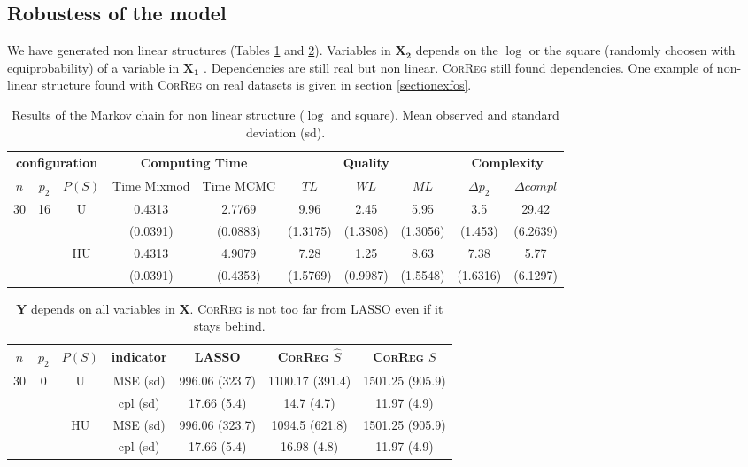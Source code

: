 \documentclass[11pt,a4paper]{article}
\begin{document}
\subsection{Robustess of the model}
 We have generated non linear structures (Tables \ref{compZnonlin} and \ref{resYnonlin}). Variables in $\boldsymbol{X_2}$ depends on the $\log$ or the square (randomly choosen with equiprobability) of a variable in $\boldsymbol{X_1}$ . Dependencies are still real but non linear. \textsc{CorReg} still found dependencies. One example of non-linear structure found with \textsc{CorReg} on real datasets is given in section \ref{sectionexfos}.
\begin{table}[h!]
\centering
\begin{tabular}{|c|c|c|c|c|c|c|c|c|c|}
\hline
\multicolumn{3}{|c}{configuration}  &  \multicolumn{2}{|c}{Computing Time}  & \multicolumn{3}{|c}{Quality} & \multicolumn{2}{|c|}{Complexity}\\
\hline
$n$ & $p_2$ & $P(S)$&Time Mixmod  & Time MCMC  & $TL$ & $WL$ & $ML$ & $\Delta p_2$ & $\Delta compl$ \\
\hline
30 & 16 & U& 0.4313 & 2.7769 & 9.96 & 2.45 & 5.95 & 3.5 & 29.42  \\
& & &(0.0391) & (0.0883) & (1.3175) & (1.3808) & (1.3056) & (1.453) & (6.2639) \\
 &  & HU & 0.4313 & 4.9079 & 7.28 & 1.25 & 8.63 & 7.38 & 5.77  \\ 
& & &(0.0391) & (0.4353) & (1.5769) & (0.9987) & (1.5548) & (1.6316) & (6.1297) \\ 
\hline
\end{tabular} 
\caption{Results of the Markov chain for non linear structure ($\log$ and square). Mean observed and standard deviation (sd). } \label{compZnonlin}
\end{table}


\begin{table}[h!]
\centering
\begin{tabular}{|c|c|c|c|c|c|c|}
\hline 
$n$ & $p_2$& $P(S)$ &indicator &LASSO  &    \textsc{CorReg} $\hat S$& \textsc{CorReg} $S$\\ 
\hline %
30 & 0 & U&MSE (sd) & 996.06 (323.7) & 1100.17 (391.4) & 1501.25 (905.9) \\
& & &cpl (sd) & 17.66 (5.4) & 14.7 (4.7) & 11.97 (4.9) \\
 &  &HU &MSE (sd) & 996.06 (323.7) & 1094.5 (621.8) & 1501.25 (905.9) \\
& & & cpl (sd) & 17.66 (5.4) & 16.98 (4.8) & 11.97 (4.9) \\ 
\hline
\end{tabular} 
\caption{ $\boldsymbol{Y}$ depends on all variables in $\boldsymbol{X}$. \textsc{CorReg} is not too far from LASSO even if it stays behind. } \label{resYnonlin}
\end{table}
\end{document}
